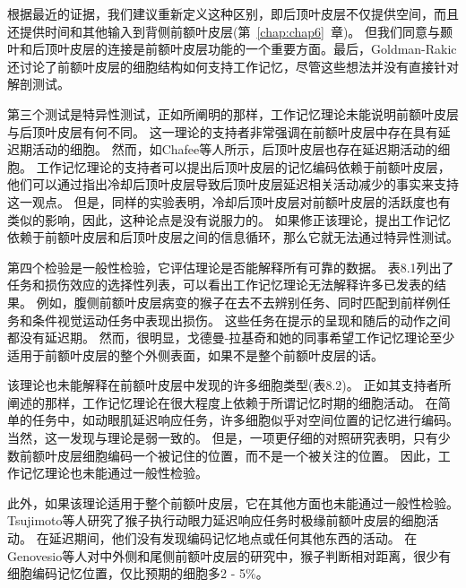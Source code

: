 根据最近的证据，我们建议重新定义这种区别，即后顶叶皮层不仅提供空间，而且还提供时间和其他输入到背侧前额叶皮层(第~\ref{chap:chap6}~章)。
但我们同意与颞叶和后顶叶皮层的连接是前额叶皮层功能的一个重要方面。最后，Goldman-Rakic还讨论了前额叶皮层的细胞结构如何支持工作记忆\cite{goldman1995cellular,constantinidis2001coding}，尽管这些想法并没有直接针对解剖测试。
\par


第三个测试是特异性测试，正如所阐明的那样，工作记忆理论未能说明前额叶皮层与后顶叶皮层有何不同。
这一理论的支持者非常强调在前额叶皮层中存在具有延迟期活动的细胞。
然而，如Chafee等人所示\cite{chafee1998matching}，后顶叶皮层也存在延迟期活动的细胞。
工作记忆理论的支持者可以提出后顶叶皮层的记忆编码依赖于前额叶皮层，他们可以通过指出冷却后顶叶皮层导致后顶叶皮层延迟相关活动减少的事实来支持这一观点\cite{chafee2000inactivation}。
但是，同样的实验表明，冷却后顶叶皮层对前额叶皮层的活跃度也有类似的影响，因此，这种论点是没有说服力的。
如果修正该理论，提出工作记忆依赖于前额叶皮层和后顶叶皮层之间的信息循环，那么它就无法通过特异性测试。
\par


第四个检验是一般性检验，它评估理论是否能解释所有可靠的数据。
表8.1列出了任务和损伤效应的选择性列表，可以看出工作记忆理论无法解释许多已发表的结果。
例如，腹侧前额叶皮层病变的猴子在去不去辨别任务\cite{iversen1970perseverative}、同时匹配到前样例任务\cite{rushworth1997ventral}和条件视觉运动任务\cite{bussey2001role}中表现出损伤。
这些任务在提示的呈现和随后的动作之间都没有延迟期。
然而，很明显，戈德曼-拉基奇和她的同事\cite{bussey2001role}希望工作记忆理论至少适用于前额叶皮层的整个外侧表面，如果不是整个前额叶皮层的话。
\par


该理论也未能解释在前额叶皮层中发现的许多细胞类型(表8.2)。
正如其支持者所阐述的那样，工作记忆理论在很大程度上依赖于所谓记忆时期的细胞活动。
在简单的任务中，如动眼肌延迟响应任务，许多细胞似乎对空间位置的记忆进行编码。
当然，这一发现与理论是弱一致的\cite{funahashi1989mnemonic}。
但是，一项更仔细的对照研究表明，只有少数前额叶皮层细胞编码一个被记住的位置，而不是一个被关注的位置\cite{lebedev2004representation}。
因此，工作记忆理论也未能通过一般性检验。
\par


此外，如果该理论适用于整个前额叶皮层，它在其他方面也未能通过一般性检验。
Tsujimoto等人\cite{tsujimoto2010evaluating}研究了猴子执行动眼力延迟响应任务时极缘前额叶皮层的细胞活动。
在延迟期间，他们没有发现编码记忆地点或任何其他东西的活动。
在Genovesio等人\cite{genovesio2011prefrontal}对中外侧和尾侧前额叶皮层的研究中，猴子判断相对距离，很少有细胞编码记忆位置，仅比预期的细胞多2 - 5\%。
\par


